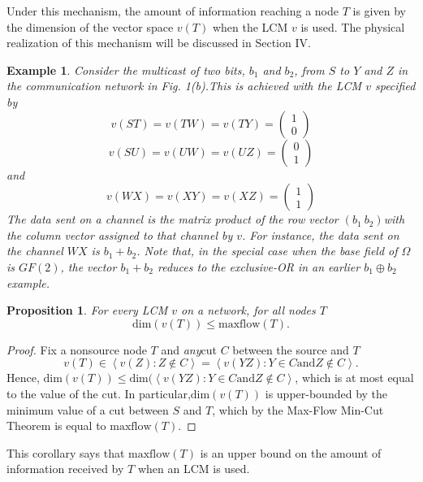 \documentclass{IEEEtran}
\newtheorem{prop}{Proposition}
\newtheorem{exam}{Example}
\newtheorem{proof}{\hskip 2em Proof}
\begin{document}
\par 
Under this mechanism, the amount of information reaching a node $T$ is given by the dimension of the vector space $v(T)$ when the LCM $v$ is used. The physical realization of this mechanism will be discussed in Section IV.
\begin{exam}
	Consider the multicast of two bits, $b_1$ and $b_2$, from $S$ to $Y$ and $Z$ in the communication network in Fig. 1(b).This is achieved with the LCM $v$ specified by
	$$ v(ST)=v(TW)=v(TY)=\begin{pmatrix} 1 \\ 0 \end{pmatrix}$$
	$$ v(SU)=v(UW)=v(UZ)=\begin{pmatrix} 0 \\ 1 \end{pmatrix}$$
	and
	$$ v(WX)=v(XY)=v(XZ)=\begin{pmatrix} 1 \\ 1 \end{pmatrix}$$
	The data sent on a channel is the matrix product of the \emph{row} vector $(b_1 \ b_2) $with the \emph{column} vector assigned to that channel by $v$. For instance, the data sent on the channel $WX$ is $b_1+b_2$. Note that, in the special case when the base field of $\Omega$ is $GF(2)$, the vector $b_1+b_2$ reduces to the exclusive-OR in an earlier $b_1\oplus b_2$ example.
\end{exam}
\begin{prop}
	For every LCM $v$ on a network, for all nodes $T$
	$$ \text{dim}(v(T)) \leq \text{maxflow}(T).$$
\end{prop}
\begin{proof}
	Fix a nonsource node $T$ and \emph{any}cut $C$ between the source and $T$
	$$v(T)\in \left \langle v(Z):Z\notin C \right \rangle = \left \langle v(YZ):Y\in C \text{and} Z\notin C \right \rangle.$$
	Hence, $\text{dim}(v(T))\leq \text{dim}(\left \langle v(YZ):Y\in C \text{and} Z\notin C \right \rangle$, which is at most equal to the value of the cut. In particular,$\text{dim}(v(T))$ is upper-bounded by the minimum value of a cut between $S$ and $T$, which by the Max-Flow Min-Cut Theorem is equal to $\text{maxflow}(T)$.
\end{proof}
\par 
This corollary says that $\text{maxflow}(T)$ is an upper bound on the amount of information received by $T$ when an LCM is used.
\end{document}

